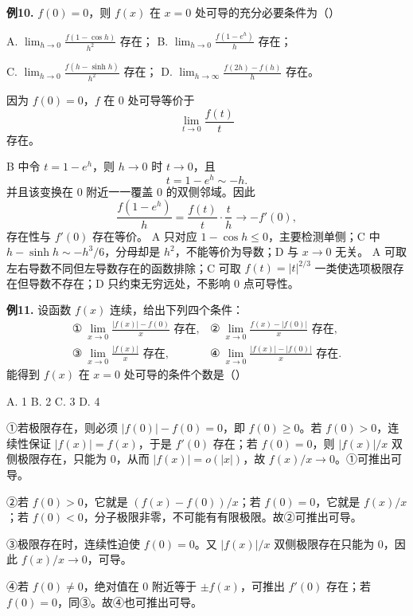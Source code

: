 \begin{problemblock}
\textbf{例10.} \(f(0)=0\)，则 \(f(x)\) 在 \(x=0\) 处可导的充分必要条件为（\quad）

A. \(\displaystyle\lim_{h\to0}\frac{f(1-\cos h)}{h^2}\) 存在；
B. \(\displaystyle\lim_{h\to0}\frac{f(1-e^h)}{h}\) 存在；

C. \(\displaystyle\lim_{h\to0}\frac{f(h-\sinh h)}{h^2}\) 存在；
D. \(\displaystyle\lim_{h\to\infty}\frac{f(2h)-f(h)}h\) 存在。
\end{problemblock}
\begin{solutionblock}
因为 \(f(0)=0\)，\(f\) 在 0 处可导等价于
\[
\lim_{t\to0}\frac{f(t)}t
\]
存在。

B 中令 \(t=1-e^h\)，则 \(h\to0\) 时 \(t\to0\)，且
\[
t=1-e^h\sim-h.
\]
并且该变换在 0 附近一一覆盖 0 的双侧邻域。因此
\[
\frac{f(1-e^h)}h
=\frac{f(t)}t\cdot\frac{t}{h}\to -f'(0),
\]
存在性与 \(f'(0)\) 存在等价。
A 只对应 \(1-
\cos h\le0\)，主要检测单侧；C 中 \(h-\sinh h\sim-h^3/6\)，分母却是 \(h^2\)，不能等价为导数；D 与 \(x\to0\) 无关。
A 可取左右导数不同但左导数存在的函数排除；C 可取 \(f(t)=|t|^{2/3}\) 一类使选项极限存在但导数不存在；D 只约束无穷远处，不影响 0 点可导性。
\end{solutionblock}

\begin{problemblock}
\textbf{例11.} 设函数 \(f(x)\) 连续，给出下列四个条件：
\[
\begin{array}{ll}
①\ \displaystyle\lim_{x\to0}\frac{|f(x)|-f(0)}x\text{ 存在},&
②\ \displaystyle\lim_{x\to0}\frac{f(x)-|f(0)|}x\text{ 存在},\\[2mm]
③\ \displaystyle\lim_{x\to0}\frac{|f(x)|}x\text{ 存在},&
④\ \displaystyle\lim_{x\to0}\frac{|f(x)|-|f(0)|}x\text{ 存在}.
\end{array}
\]
能得到 \(f(x)\) 在 \(x=0\) 处可导的条件个数是（\quad）

A. 1 \qquad B. 2 \qquad C. 3 \qquad D. 4
\end{problemblock}
\begin{solutionblock}
①若极限存在，则必须 \(|f(0)|-f(0)=0\)，即 \(f(0)\ge0\)。若 \(f(0)>0\)，连续性保证 \(|f(x)|=f(x)\)，于是 \(f'(0)\) 存在；若 \(f(0)=0\)，则 \(|f(x)|/x\) 双侧极限存在，只能为 0，从而 \(|f(x)|=o(|x|)\)，故 \(f(x)/x\to0\)。①可推出可导。

②若 \(f(0)>0\)，它就是 \((f(x)-f(0))/x\)；若 \(f(0)=0\)，它就是 \(f(x)/x\)；若 \(f(0)<0\)，分子极限非零，不可能有有限极限。故②可推出可导。

③极限存在时，连续性迫使 \(f(0)=0\)。又 \(|f(x)|/x\) 双侧极限存在只能为 0，因此 \(f(x)/x\to0\)，可导。

④若 \(f(0)\ne0\)，绝对值在 0 附近等于 \(\pm f(x)\)，可推出 \(f'(0)\) 存在；若 \(f(0)=0\)，同③。故④也可推出可导。
\end{solutionblock}

